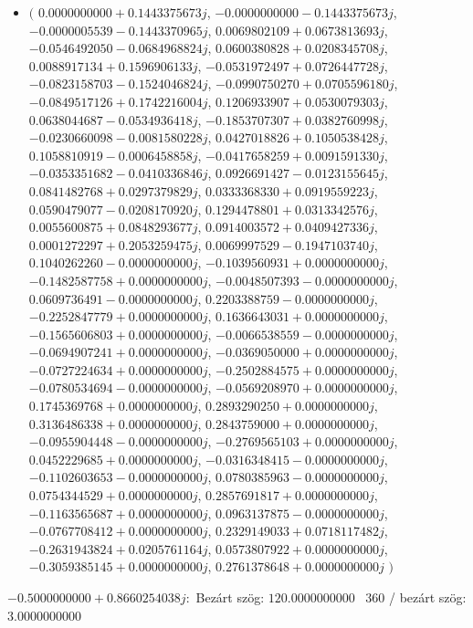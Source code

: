 \documentclass[14pt,a4paper]{article}
\begin{document}
\begin{itemize}
\item
$\big($
$0.0000000000+0.1443375673j$, $-0.0000000000-0.1443375673j$, $-0.0000005539-0.1443370965j$, $0.0069802109+0.0673813693j$, $-0.0546492050-0.0684968824j$, $0.0600380828+0.0208345708j$, $0.0088917134+0.1596906133j$, $-0.0531972497+0.0726447728j$, $-0.0823158703-0.1524046824j$, $-0.0990750270+0.0705596180j$, $-0.0849517126+0.1742216004j$, $0.1206933907+0.0530079303j$, $0.0638044687-0.0534936418j$, $-0.1853707307+0.0382760998j$, $-0.0230660098-0.0081580228j$, $0.0427018826+0.1050538428j$, $0.1058810919-0.0006458858j$, $-0.0417658259+0.0091591330j$, $-0.0353351682-0.0410336846j$, $0.0926691427-0.0123155645j$, $0.0841482768+0.0297379829j$, $0.0333368330+0.0919559223j$, $0.0590479077-0.0208170920j$, $0.1294478801+0.0313342576j$, $0.0055600875+0.0848293677j$, $0.0914003572+0.0409427336j$, $0.0001272297+0.2053259475j$, $0.0069997529-0.1947103740j$, $0.1040262260-0.0000000000j$, $-0.1039560931+0.0000000000j$, $-0.1482587758+0.0000000000j$, $-0.0048507393-0.0000000000j$, $0.0609736491-0.0000000000j$, $0.2203388759-0.0000000000j$, $-0.2252847779+0.0000000000j$, $0.1636643031+0.0000000000j$, $-0.1565606803+0.0000000000j$, $-0.0066538559-0.0000000000j$, $-0.0694907241+0.0000000000j$, $-0.0369050000+0.0000000000j$, $-0.0727224634+0.0000000000j$, $-0.2502884575+0.0000000000j$, $-0.0780534694-0.0000000000j$, $-0.0569208970+0.0000000000j$, $0.1745369768+0.0000000000j$, $0.2893290250+0.0000000000j$, $0.3136486338+0.0000000000j$, $0.2843759000+0.0000000000j$, $-0.0955904448-0.0000000000j$, $-0.2769565103+0.0000000000j$, $0.0452229685+0.0000000000j$, $-0.0316348415-0.0000000000j$, $-0.1102603653-0.0000000000j$, $0.0780385963-0.0000000000j$, $0.0754344529+0.0000000000j$, $0.2857691817+0.0000000000j$, $-0.1163565687+0.0000000000j$, $0.0963137875-0.0000000000j$, $-0.0767708412+0.0000000000j$, $0.2329149033+0.0718117482j$, $-0.2631943824+0.0205761164j$, $0.0573807922+0.0000000000j$, $-0.3059385145+0.0000000000j$, $0.2761378648+0.0000000000j$
$\big)$
\end{itemize}
$-0.5000000000+0.8660254038j$:\
Bezárt szög: $120.0000000000$ \
360 / bezárt szög: $3.0000000000$\
\end{document}
